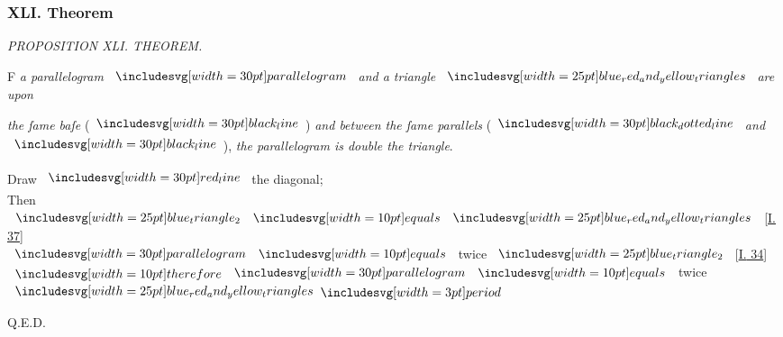 \documentclass[11pt,preview]{standalone}
\begin{document}
\subsubsection{XLI. Theorem}

\hfill

\begin{minipage}[t]{0.43\textwidth}
    \vspace{20pt}
    
\end{minipage}%
\hfill
\begin{minipage}[t]{0.55\textwidth}
    \begin{center}
        \textit{PROPOSITION XLI. THEOREM.}\label{book1pr41} \\
    \end{center}

    \hfill

    \begin{center}
        \raggedright \lettrine[lines=3, loversize=1, nindent=0pt]{}{}F \textit{a parallelogram} $\img[0][0][30]{parallelogram}$ \textit{and a triangle} $\img{blue_red_and_yellow_triangles}$ \textit{are upon}
    \end{center}
    \textit{the ſame baſe} (\hspace{-1ex}$\blackline$\hspace{-1ex}) \textit{and between the ſame parallels} (\hspace{-1ex}$\dottedblackline$ \textit{and} $\blackline$\hspace{-1ex}), \textit{the parallelogram is double the triangle}.
\end{minipage}

\hfill

\hfill

\begin{center}
    Draw $\redline$ the diagonal;\\
    Then $\img{blue_triangle_2} \bequals \img{blue_red_and_yellow_triangles}$ [\hyperref[book1pr37]{\textsc{I.} 37}]\\
    $\img[0][0][30]{parallelogram} \bequals$ twice $\img{blue_triangle_2}$ [\hyperref[book1pr34]{\textsc{I.} 34}]\\
    $\btherefore \img[0][0][30]{parallelogram} \bequals$ twice $\img{blue_red_and_yellow_triangles} \bperiod$
\end{center}

\hfill

\hfill Q.E.D.
\end{document}
